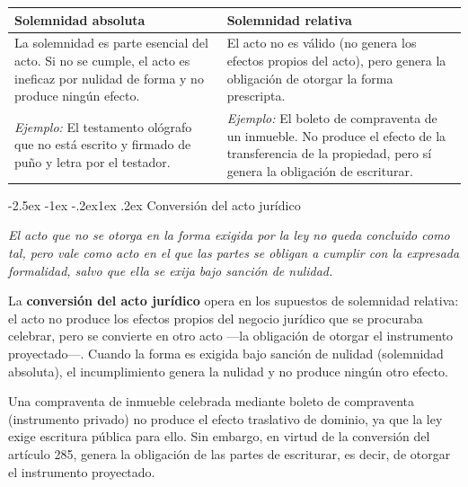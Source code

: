 \documentclass[12pt,oneside]{book}
\makeatletter
\renewcommand\subsection{\@startsection{subsection}{2}{\z@}%
  {-2.5ex \@plus -1ex \@minus -.2ex}{1ex \@plus .2ex}%
  {\normalfont\normalsize\bfseries}}
\makeatother
\begin{document}
\begin{table}[H]
\centering
\begin{tabularx}{\textwidth}{>{\raggedright\arraybackslash}X
                              >{\raggedright\arraybackslash}X}
\toprule
\textbf{Solemnidad absoluta} & \textbf{Solemnidad relativa} \\
\midrule
La solemnidad es parte esencial del acto. Si no se cumple, el acto es ineficaz por nulidad de forma y no produce ningún efecto. & El acto no es válido (no genera los efectos propios del acto), pero genera la obligación de otorgar la forma prescripta. \\[6pt]
\textit{Ejemplo:} El testamento ológrafo que no está escrito y firmado de puño y letra por el testador. & \textit{Ejemplo:} El boleto de compraventa de un inmueble. No produce el efecto de la transferencia de la propiedad, pero sí genera la obligación de escriturar. \\
\bottomrule
\end{tabularx}
\end{table}

\subsection{Conversión del acto jurídico}

\begin{regla}
\textit{El acto que no se otorga en la forma exigida por la ley no queda concluido como tal, pero vale como acto en el que las partes se obligan a cumplir con la expresada formalidad, salvo que ella se exija bajo sanción de nulidad.}
\end{regla}

La \textbf{conversión del acto jurídico} opera en los supuestos de solemnidad relativa: el acto no produce los efectos propios del negocio jurídico que se procuraba celebrar, pero se convierte en otro acto ---la obligación de otorgar el instrumento proyectado---. Cuando la forma es exigida bajo sanción de nulidad (solemnidad absoluta), el incumplimiento genera la nulidad y no produce ningún otro efecto.

\begin{ejemplo}
Una compraventa de inmueble celebrada mediante boleto de compraventa (instrumento privado) no produce el efecto traslativo de dominio, ya que la ley exige escritura pública para ello. Sin embargo, en virtud de la conversión del artículo 285, genera la obligación de las partes de escriturar, es decir, de otorgar el instrumento proyectado.
\end{ejemplo}
\end{document}
